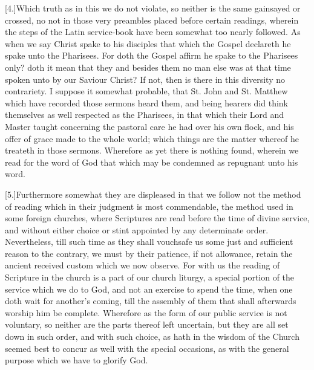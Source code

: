 [4.]Which truth as in this we do not violate, so neither is the same gainsayed or crossed, no not in those very preambles placed before certain readings, wherein the steps of the Latin service-book have been somewhat too nearly followed. As when we say Christ spake to his disciples that which the Gospel declareth he spake unto the Pharisees. For doth the Gospel affirm he spake to the Pharisees only? doth it mean that they and besides them no man else was at that time spoken unto by our Saviour Christ? If not, then is there in this diversity no contrariety. I suppose it somewhat probable, that St. John and St. Matthew which have recorded those sermons heard them, and being hearers did think themselves as well respected as the Pharisees, in that which their  Lord and Master taught concerning the pastoral care he had over his own flock,
 and his offer of grace made to the whole world; which things are the matter whereof he treateth in those sermons. Wherefore as yet there is nothing found, wherein we read for the word of God that which may be condemned as repugnant unto his word.

[5.]Furthermore somewhat they are displeased in that we follow not the method of reading which in their judgment is most commendable, the method used in some foreign churches, where Scriptures are read before the time of divine service, and without either choice or stint appointed by any determinate order. Nevertheless, till such time as they shall vouchsafe us some just and sufficient reason to the contrary, we must by their patience, if not allowance, retain the ancient received custom which we now observe. For with us the reading of Scripture in the church is a part of our church liturgy, a special portion of the service which we do to God, and not an exercise to spend the time, when one doth wait for another’s coming, till the assembly of them that shall afterwards worship him be complete. Wherefore as the form of our public service is not voluntary, so neither are the parts thereof left uncertain, but they are all set down in such order, and with such choice, as hath in the wisdom of the Church seemed best to concur as well with the special occasions, as with the general purpose which we have to glorify God.



